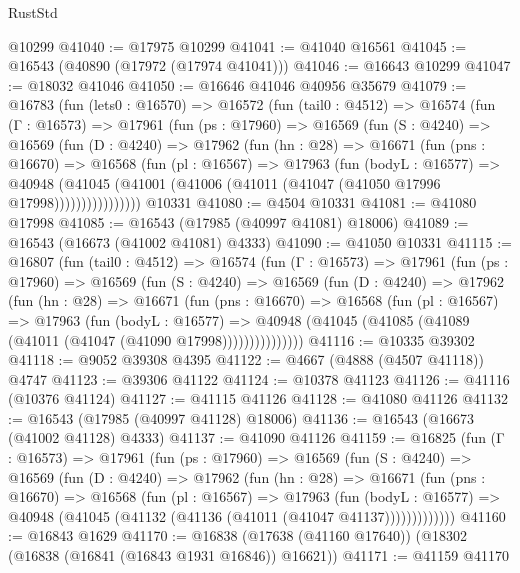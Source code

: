 \begin{lexlean}{RustStd}
\begin{coremodule}
    @10299
@41040 := @17975 @10299
@41041 := @41040 @16561
@41045 := @16543 (@40890 (@17972 (@17974 @41041)))
@41046 := @16643 @10299
@41047 := @18032 @41046
@41050 := @16646 @41046 @40956 @35679
@41079 := @16783
    (fun (lets0 : @16570) =>
    @16572
      (fun (tail0 : @4512) =>
      @16574
        (fun (Γ : @16573) =>
        @17961
          (fun (ps : @17960) =>
          @16569
            (fun (S : @4240) =>
            @16569
              (fun (D : @4240) =>
              @17962
                (fun (hn : @28) =>
                @16671
                  (fun (pns : @16670) =>
                  @16568
                    (fun (pl : @16567) =>
                    @17963
                      (fun (bodyL : @16577) =>
                      @40948
                        (@41045
                          (@41001 (@41006 (@41011 (@41047 (@41050 @17996 @17998))))))))))))))))
    @10331
@41080 := @4504 @10331
@41081 := @41080 @17998
@41085 := @16543 (@17985 (@40997 @41081) @18006)
@41089 := @16543 (@16673 (@41002 @41081) @4333)
@41090 := @41050 @10331
@41115 := @16807
    (fun (tail0 : @4512) =>
    @16574
      (fun (Γ : @16573) =>
      @17961
        (fun (ps : @17960) =>
        @16569
          (fun (S : @4240) =>
          @16569
            (fun (D : @4240) =>
            @17962
              (fun (hn : @28) =>
              @16671
                (fun (pns : @16670) =>
                @16568
                  (fun (pl : @16567) =>
                  @17963
                    (fun (bodyL : @16577) =>
                    @40948 (@41045 (@41085 (@41089 (@41011 (@41047 (@41090 @17998)))))))))))))))
@41116 := @10335 @39302
@41118 := @9052 @39308 @4395
@41122 := @4667 (@4888 (@4507 @41118)) @4747
@41123 := @39306 @41122
@41124 := @10378 @41123
@41126 := @41116 (@10376 @41124)
@41127 := @41115 @41126
@41128 := @41080 @41126
@41132 := @16543 (@17985 (@40997 @41128) @18006)
@41136 := @16543 (@16673 (@41002 @41128) @4333)
@41137 := @41090 @41126
@41159 := @16825
    (fun (Γ : @16573) =>
    @17961
      (fun (ps : @17960) =>
      @16569
        (fun (S : @4240) =>
        @16569
          (fun (D : @4240) =>
          @17962
            (fun (hn : @28) =>
            @16671
              (fun (pns : @16670) =>
              @16568
                (fun (pl : @16567) =>
                @17963
                  (fun (bodyL : @16577) =>
                  @40948 (@41045 (@41132 (@41136 (@41011 (@41047 @41137)))))))))))))
@41160 := @16843 @1629
@41170 := @16838 (@17638 (@41160 @17640)) (@18302 (@16838 (@16841 (@16843 @1931 @16846)) @16621))
@41171 := @41159 @41170

\end{coremodule}
\end{lexlean}
